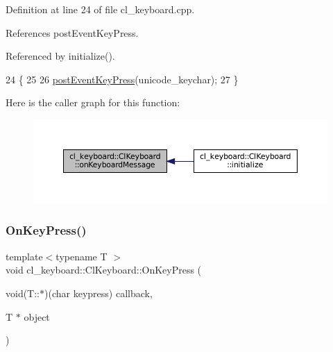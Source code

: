 Definition at line 24 of file cl\+\_\+keyboard.\+cpp.



References post\+Event\+Key\+Press.



Referenced by initialize().


\begin{DoxyCode}
24                                                                         \{
25   
26   \hyperlink{classcl__keyboard_1_1ClKeyboard_ae9811fd50207ba9b69a4f27e7f8b4e86}{postEventKeyPress}(unicode\_keychar);
27 \}
\end{DoxyCode}
Here is the caller graph for this function\+:
\nopagebreak
\begin{figure}[H]
\begin{center}
\leavevmode
\includegraphics[width=350pt]{classcl__keyboard_1_1ClKeyboard_aff50ebe6b1b4aad0ea5b933ab0f00ef4_icgraph}
\end{center}
\end{figure}
\mbox{\label{classcl__keyboard_1_1ClKeyboard_ae9f4a6dc1ce18397394a432826970baa}} 
\subsubsection{\texorpdfstring{On\+Key\+Press()}{OnKeyPress()}}
{\footnotesize\ttfamily template$<$typename T $>$ \\
void cl\+\_\+keyboard\+::\+Cl\+Keyboard\+::\+On\+Key\+Press (\begin{DoxyParamCaption}\item[{void(T\+::$\ast$)(char keypress)}]{callback,  }\item[{T $\ast$}]{object }\end{DoxyParamCaption})\hspace{0.3cm}{\ttfamily [inline]}}



